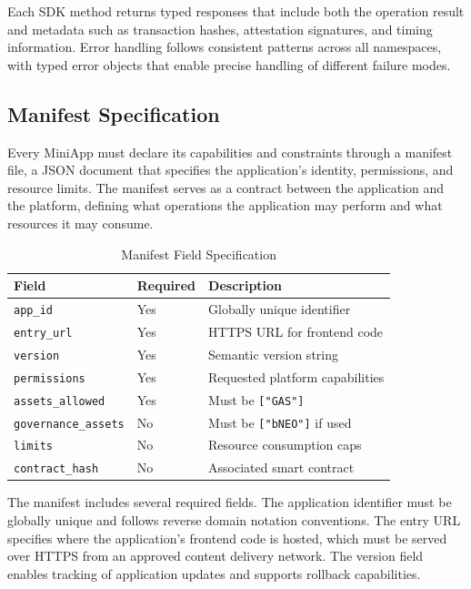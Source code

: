 \documentclass[11pt,a4paper]{article}
\begin{document}
Each SDK method returns typed responses that include both the operation result and metadata such as transaction hashes, attestation signatures, and timing information. Error handling follows consistent patterns across all namespaces, with typed error objects that enable precise handling of different failure modes.

\subsection{Manifest Specification}

Every MiniApp must declare its capabilities and constraints through a manifest file, a JSON document that specifies the application's identity, permissions, and resource limits. The manifest serves as a contract between the application and the platform, defining what operations the application may perform and what resources it may consume.

\begin{table}[h]
\centering
\caption{Manifest Field Specification}
\begin{tabular}{@{}llp{5cm}@{}}
\toprule
\textbf{Field} & \textbf{Required} & \textbf{Description} \\
\midrule
\texttt{app\_id} & Yes & Globally unique identifier \\
\texttt{entry\_url} & Yes & HTTPS URL for frontend code \\
\texttt{version} & Yes & Semantic version string \\
\texttt{permissions} & Yes & Requested platform capabilities \\
\texttt{assets\_allowed} & Yes & Must be \texttt{["GAS"]} \\
\texttt{governance\_assets} & No & Must be \texttt{["bNEO"]} if used \\
\texttt{limits} & No & Resource consumption caps \\
\texttt{contract\_hash} & No & Associated smart contract \\
\bottomrule
\end{tabular}
\label{tab:manifest-fields}
\end{table}

The manifest includes several required fields. The application identifier must be globally unique and follows reverse domain notation conventions. The entry URL specifies where the application's frontend code is hosted, which must be served over HTTPS from an approved content delivery network. The version field enables tracking of application updates and supports rollback capabilities.
\end{document}
